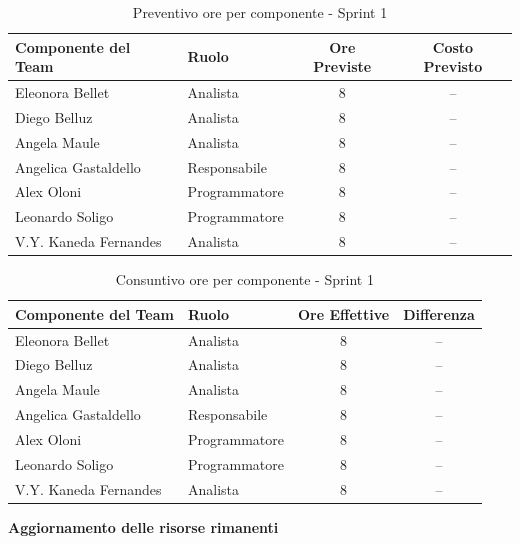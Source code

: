 \documentclass[a4paper,12pt]{article}
\begin{document}
\begin{table}[H]
\centering
\caption{Preventivo ore per componente - Sprint 1}
\label{tab:preventivo-sprint1}
\vspace{2mm}
\begin{tabular}{llcc}
\toprule
\textbf{Componente del Team} & \textbf{Ruolo} & \textbf{Ore Previste} & \textbf{Costo Previsto} \\
\midrule
Eleonora Bellet & Analista & 8 & -- \\
Diego Belluz & Analista & 8 & -- \\
Angela Maule & Analista & 8 & -- \\
Angelica Gastaldello & Responsabile & 8 & -- \\
Alex Oloni & Programmatore & 8 & -- \\
Leonardo Soligo & Programmatore & 8 & -- \\
V.Y. Kaneda Fernandes & Analista & 8 & -- \\
\bottomrule
\end{tabular}
\end{table}

\begin{table}[H]
\centering
\caption{Consuntivo ore per componente - Sprint 1}
\label{tab:consuntivo-sprint1}
\vspace{2mm}
\begin{tabular}{llcc}
\toprule
\textbf{Componente del Team} & \textbf{Ruolo} & \textbf{Ore Effettive} & \textbf{Differenza} \\
\midrule
Eleonora Bellet & Analista & 8 & -- \\
Diego Belluz & Analista & 8 & -- \\
Angela Maule & Analista & 8 & -- \\
Angelica Gastaldello & Responsabile & 8 & -- \\
Alex Oloni & Programmatore & 8 & -- \\
Leonardo Soligo & Programmatore & 8 & -- \\
V.Y. Kaneda Fernandes & Analista & 8 & -- \\
\bottomrule
\end{tabular}
\end{table}

\vspace{0.5cm} %
\noindent\textbf{Aggiornamento delle risorse rimanenti}
\end{document}
